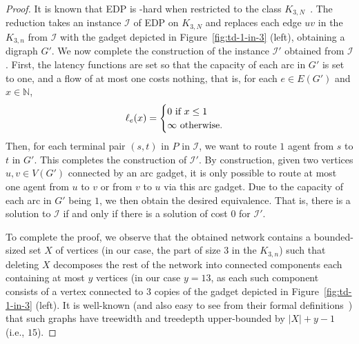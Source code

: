 \documentclass[letterpaper]{article} %
\begin{document}
\begin{proof}
It is known that \textsc{EDP} is \NP-hard when restricted to the class $K_{3,N}$~\cite{FleszarMS18}.
The reduction takes an instance $\mathcal{I}$ of \textsc{EDP} on $K_{3,N}$ and replaces each edge $uv$ in the $K_{3,n}$ from $\mathcal{I}$ with the gadget depicted in Figure~\ref{fig:td-1-in-3} (left), obtaining a digraph $G'$.
We now complete the construction of the instance $\mathcal{I}'$ obtained from $\mathcal{I}$. First, the latency functions are set so that the capacity of each arc in $G'$ is set to one, and a flow of at most one costs nothing, that is, for each $e\in E(G')$ and $x\in \mathbb{N}$,
\[
\ell_e(x) =
\begin{cases}
	0 $ if $ x \leq 1 \\
	\infty $ otherwise$.
\end{cases}
\]
Then, for each terminal pair $(s,t)$ in $P$ in $\mathcal{I}$, we want to route $1$ agent from $s$ to $t$ in $G'$.
This completes the construction of $\mathcal{I}'$.
By construction, given two vertices $u,v\in V(G')$ connected by an arc gadget, it is only possible to route at most one agent from $u$ to $v$ or from $v$ to $u$ via this arc gadget.
Due to the capacity of each arc in $G'$ being $1$, we then obtain the desired equivalence.
That is, there is a solution to $\mathcal{I}$ if and only if there is a solution of cost $0$ for $\mathcal{I}'$.

To complete the proof, we observe that the obtained network contains a bounded-sized set $X$ of vertices (in our case, the part of size $3$ in the $K_{3,n}$) such that deleting $X$ decomposes the rest of the network into connected components each containing at most $y$ vertices (in our case $y=13$, as each such component consists of a vertex connected to $3$ copies of the gadget depicted in Figure~\ref{fig:td-1-in-3} (left). It is well-known (and also easy to see from their formal definitions~\cite{RobertsonS86,sparsity,CyganFKLMPPS15}) that such graphs have treewidth and treedepth upper-bounded by $|X|+y-1$ (i.e., $15$).
\end{proof}
\end{document}
